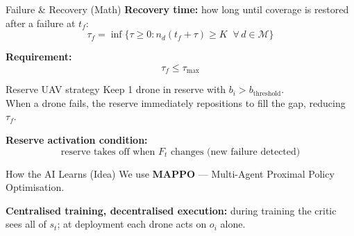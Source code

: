 \documentclass[aspectratio=169,12pt]{beamer}
\begin{document}
\begin{frame}{Failure \& Recovery (Math)}
\textbf{Recovery time:} how long until coverage is restored after a failure at $t_f$:
\[
\tau_f = \inf\!\bigl\{\tau \ge 0 :
  n_d(t_f + \tau) \ge K \;\;\forall\, d \in \mathcal{M}\bigr\}
\]

\vspace{0.4em}
\textbf{Requirement:}
\[
\tau_f \le \tau_{\max}
\]

\vspace{0.4em}
\begin{block}{Reserve UAV strategy}
Keep 1 drone in reserve with $b_i > b_{\text{threshold}}$.\\
When a drone fails, the reserve immediately repositions to fill the gap, reducing $\tau_f$.
\end{block}

\vspace{0.3em}
\textbf{Reserve activation condition:}
\[
\text{reserve takes off when } F_t \text{ changes (new failure detected)}
\]
\end{frame}


\begin{frame}{How the AI Learns (Idea)}
We use \textbf{MAPPO} --- Multi-Agent Proximal Policy Optimisation.

\vspace{0.3em}
\begin{center}
\end{center}

\vspace{0.3em}
\textbf{Centralised training, decentralised execution:} during training the critic sees all of $s_t$; at deployment each drone acts on $o_i$ alone.
\end{frame}
\end{document}
